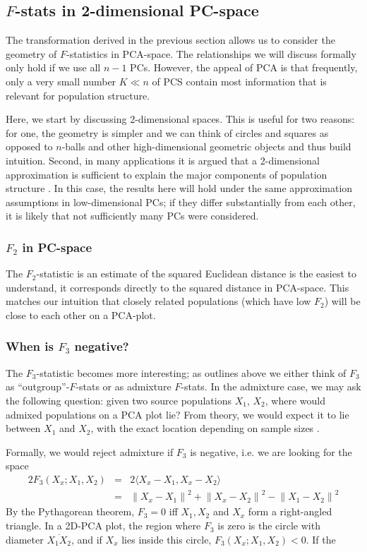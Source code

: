 \documentclass[12pt,a4pape, fullpage]{article}
\newcommand{\normsq}[1]{\left\lVert#1\right\rVert^2}
\begin{document}
\subsection{$F$-stats in 2-dimensional PC-space}
The transformation derived in the previous section allows us to consider the geometry of $F$-statistics in PCA-space. The relationships we will discuss formally only hold if we use all $n-1$ PCs. However, the appeal of PCA is that frequently, only a very small number $K \ll n$ of PCS contain most information that is relevant for population structure.

Here, we start by discussing 2-dimensional spaces. This is useful for two reasons: for one, the geometry is simpler and we can think of circles and squares as opposed to $n$-balls and other high-dimensional geometric objects and thus build intuition. Second, in many applications it is argued that a 2-dimensional approximation is sufficient to explain the major components of population structure \cite{novembre2008}. In this case, the results here will hold under the same approximation assumptions in low-dimensional PCs; if they differ substantially from each other, it is likely that not sufficiently many PCs were considered.


\subsubsection{$F_2$ in PC-space}
The $F_2$-statistic is an estimate of the squared Euclidean distance is the easiest to understand, it corresponds directly to the squared distance in PCA-space. This matches our intuition that closely related populations (which have low $F_2$) will be close to each other on a PCA-plot.




\subsubsection{When is $F_3$ negative?}
The $F_3$-statistic becomes more interesting; as outlines above we either think of $F_3$ as ``outgroup''-$F$-stats or as admixture $F$-stats. In the admixture case, we may ask the following question: given two source populations $X_1$, $X_2$, where would admixed populations on a PCA plot lie? From theory, we would expect it to lie between $X_1$ and $X_2$, with the exact location depending on sample sizes \cite{brisbin2012, mcvean2009}. 

Formally, we would reject admixture if $F_3$ is negative, i.e. we are looking for the space
\begin{eqnarray}
2 F_3(X_x; X_1, X_2) &=& 2\langle  X_x - X_1, X_x - X_2 \rangle \nonumber\\
      &=& \normsq{X_x - X_1} + \normsq{X_x - X_2}  - \normsq{X_1 - X_2} 
\end{eqnarray}
By the Pythagorean theorem, $F_3 = 0 $ iff $X_1, X_2$ and $X_x$ form a right-angled triangle. In a 2D-PCA plot, the region where $F_3$ is zero is the circle  with diameter $\overline{X_1X_2}$, and if $X_x$ lies inside this circle, $F_3(X_x; X_1, X_2) < 0$. If the 
\end{document}
